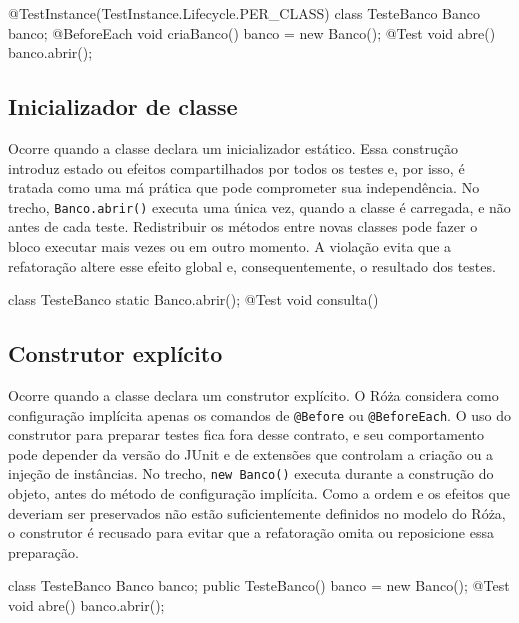\begin{violationexample}
@TestInstance(TestInstance.Lifecycle.PER_CLASS)
class TesteBanco {
    Banco banco;
    @BeforeEach void criaBanco() { banco = new Banco(); }
    @Test void abre() { banco.abrir(); }
}
\end{violationexample}

\subsection{Inicializador de classe}

Ocorre quando a classe declara um inicializador estático. Essa construção introduz estado ou efeitos compartilhados por todos os testes e, por isso, é tratada como uma má prática que pode comprometer sua independência. No trecho, \texttt{Banco.abrir()} executa uma única vez, quando a classe é carregada, e não antes de cada teste. Redistribuir os métodos entre novas classes pode fazer o bloco executar mais vezes ou em outro momento. A violação evita que a refatoração altere esse efeito global e, consequentemente, o resultado dos testes.

\begin{violationexample}
class TesteBanco {
    static { Banco.abrir(); }
    @Test void consulta() {}
}
\end{violationexample}

\subsection{Construtor explícito}

Ocorre quando a classe declara um construtor explícito. O Róża considera como configuração implícita apenas os comandos de \texttt{@Before} ou \texttt{@BeforeEach}. O uso do construtor para preparar testes fica fora desse contrato, e seu comportamento pode depender da versão do JUnit e de extensões que controlam a criação ou a injeção de instâncias. No trecho, \texttt{new Banco()} executa durante a construção do objeto, antes do método de configuração implícita. Como a ordem e os efeitos que deveriam ser preservados não estão suficientemente definidos no modelo do Róża, o construtor é recusado para evitar que a refatoração omita ou reposicione essa preparação.

\begin{violationexample}
class TesteBanco {
    Banco banco;
    public TesteBanco() { banco = new Banco(); }
    @Test void abre() { banco.abrir(); }
}
\end{violationexample}

